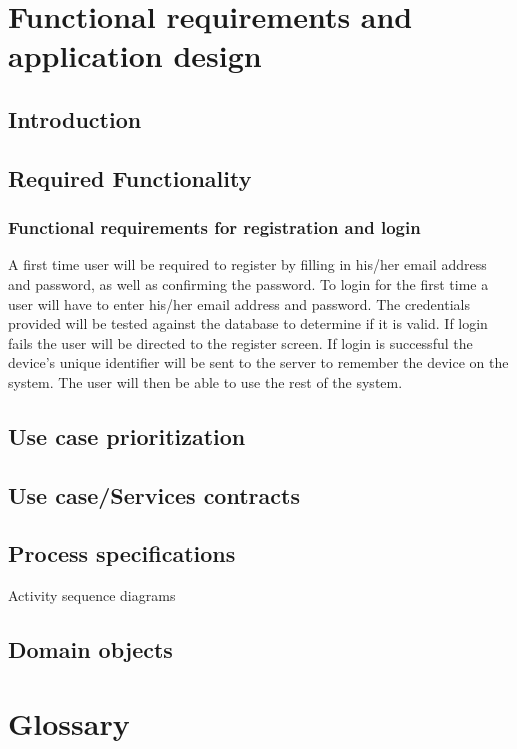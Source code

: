 \documentclass[10pt,a4paper]{article}
\begin{document}
\section{Functional requirements and application design}
\subsection{Introduction}
\subsection{Required Functionality}
\subsubsection{Functional requirements for registration and login}
A first time user will be required to register by filling in his/her email address and password, as well as confirming the password.
To login for the first time a user will have to enter his/her email address and password. The credentials provided will be tested against the database to determine if it is valid. If login fails the user will be directed to the register screen. If login is successful the device's unique identifier will be sent to the server to remember the device on the system. The user will then be able to use the rest of the system.

\subsection{Use case prioritization}
\subsection{Use case/Services contracts}
\subsection{Process specifications}
Activity sequence diagrams
\subsection{Domain objects}
\section{Glossary}
\end{document}

